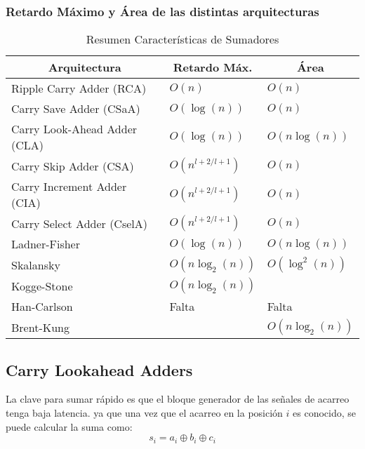 \subsubsection{Retardo Máximo y Área de las distintas arquitecturas}
\begin{table}[t]
\caption{Resumen Características de Sumadores}
\begin{tabular}{|l|l|l|}
\hline
\multicolumn{1}{|c|}{\textbf{Arquitectura}} & \multicolumn{1}{c|}{\textbf{Retardo Máx.   }} & \multicolumn{1}{c|}{\textbf{Área}} \\ \hline
Ripple Carry Adder (RCA) & \(O(n)\) & \(O(n)\) \\ \hline
Carry Save Adder (CSaA) & \(O(\log(n)) \)& \(O(n) \)\\ \hline
Carry Look-Ahead Adder (CLA) & \(O(\log(n))\) & \(O(n\log(n))\) \\ \hline
Carry Skip Adder (CSA) &\(O(n^{l+2/l+1})  \)& \(O(n)\) \\ \hline
Carry Increment Adder (CIA) &\(O(n^{l+2/l+1})  \)& \(O(n)\) \\ \hline
Carry Select Adder (CselA) &\(O(n^{l+2/l+1})  \)& \(O(n)\) \\ \hline
Ladner-Fisher &\( O(\log(n))\) & \(O(n\log(n))   \) \\ \hline
Skalansky &\( O(n\log_2(n))\) & \(O(\log^2(n))\) \\ \hline
Kogge-Stone & \( O(n\log_2(n))\) & \\ \hline
Han-Carlson &Falta &Falta \\ \hline 
Brent-Kung & \(O(\log_2(n))\ & \(O(n\log_2(n))\) \\ \hline

\end{tabular}
\label{sumadores}
\end{table}




\subsection{Carry Lookahead Adders}

La clave para sumar rápido es que el bloque generador de las señales de acarreo tenga baja latencia\cite{arithmeticComputer}.
ya que una vez que el acarreo en la posición \(i\) es conocido, se puede calcular la suma como:
$$s_i = a_i \oplus b_i\oplus c_i$$ 


